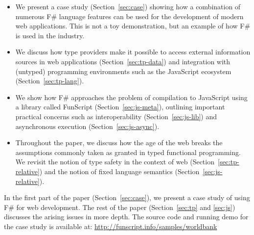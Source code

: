 \documentclass[submission,copyright,creativecommons]{eptcs}
\begin{document}
\begin{itemize}
\item We present a case study (Section~\ref{sec:case}) showing how a combination of numerous
  F\# language features can be used for the development of modern web applications. This
  is not a toy demonstration, but an example of how F\# is used in the industry.

\item We discuss how type providers make it possible to access external information sources
  in web applications (Section~\ref{sec:tp-data}) and integration with (untyped) programming
  environments such as the JavaScript ecosystem (Section~\ref{sec:tp-lang}). 

\item We show how F\# approaches the problem of compilation to JavaScript using a library 
  called FunScript (Section~\ref{sec:js-meta}), outlining important practical concerns such as 
  interoperability (Section~\ref{sec:js-lib}) and asynchronous execution (Section~\ref{sec:js-async}).

\item Throughout the paper, we discuss how the age of the web breaks the assumptions commonly 
  taken as granted in typed functional programming. We revisit the notion of type safety
  in the context of web (Section~\ref{sec:tp-relative}) and the notion of fixed language 
  semantics (Section~\ref{sec:js-relative}).
\end{itemize}

\noindent
In the first part of the paper (Section~\ref{sec:case}), we present a case study of using 
F\# for web development. The rest of the paper (Section~\ref{sec:tp} and \ref{sec:js}) discusses 
the arising issues in more depth. The source code and running demo for the case study is available 
at: \url{http://funscript.info/samples/worldbank}



%                                                  
\end{document}
